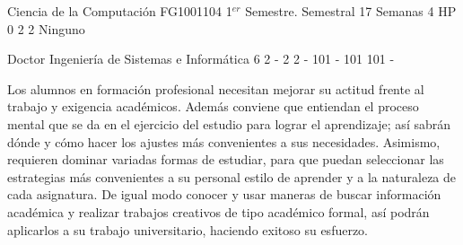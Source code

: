 \documentclass[a4paper,8pt]{article}
\begin{document}
\setNombreProfesor{}
\setGradoProfesorAbreviado{}
\sylabusHeader

\academicaTable
{Ciencia de la Computación} %
{FG1001104} %
{1$^{er}$ Semestre.} %
{Semestral} %
{17 Semanas} %
{} %
{4 HP} %
{0} %
{}  %
{2} %
{2} %
{Ninguno} %

\administrativaTable
{Doctor} %
{Ingeniería de Sistemas e Informática} %
{6} %
{2} %
{-} %
{2} %
{2} %
{-} %
{101} %
{-} %
{101} %
{101} %
{-} %


\begin{fundamentacion}
Los alumnos en formación profesional necesitan mejorar su actitud frente al trabajo y exigencia académicos. Además conviene que entiendan el proceso mental que se da en el ejercicio del estudio para lograr el aprendizaje; así  sabrán dónde y cómo hacer los ajustes más convenientes a sus necesidades. Asimismo, requieren dominar variadas formas de estudiar, para que puedan seleccionar las estrategias  más convenientes a su personal estilo de aprender y a la naturaleza de cada asignatura. De igual modo conocer y usar  maneras de buscar información académica y realizar trabajos creativos de tipo académico formal, así podrán  aplicarlos a su trabajo universitario, haciendo exitoso su esfuerzo.

\end{fundamentacion}

\begin{sumilla}
\item 
\item 
\item 
\item 

\end{sumilla}

\begin{competenciasAsignatura}
\item {}
\item {}

\end{competenciasAsignatura}
\end{document}
